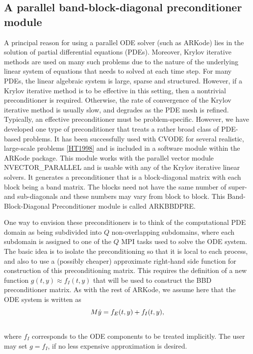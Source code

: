 \documentclass[letterpaper,10pt,english]{sphinxmanual}
\begin{document}
\subsection{A parallel band-block-diagonal preconditioner module}
\label{c_interface/Preconditioners:cinterface-bbdpre}\label{c_interface/Preconditioners:a-parallel-band-block-diagonal-preconditioner-module}
A principal reason for using a parallel ODE solver (such as ARKode)
lies in the solution of partial differential equations
(PDEs). Moreover, Krylov iterative methods are used on many such
problems due to the nature of the underlying linear system of
equations that needs to solved at each time step.  For many PDEs, the
linear algebraic system is large, sparse and structured.  However, if
a Krylov iterative method is to be effective in this setting, then a
nontrivial preconditioner is required.  Otherwise, the rate of
convergence of the Krylov iterative method is usually slow, and
degrades as the PDE mesh is refined.  Typically, an effective
preconditioner must be problem-specific.  However, we have developed
one type of preconditioner that treats a rather broad class of
PDE-based problems.  It has been successfully used with CVODE for
several realistic, large-scale problems {\hyperref[References:ht1998]{{[}HT1998{]}}} and is included
in a software module within the ARKode package.  This module works
with the parallel vector module NVECTOR\_PARALLEL and is usable
with any of the Krylov iterative linear solvers. It generates a
preconditioner that is a block-diagonal matrix with each block being a
band matrix. The blocks need not have the same number of super- and
sub-diagonals and these numbers may vary from block to block. This
Band-Block-Diagonal Preconditioner module is called ARKBBDPRE.

One way to envision these preconditioners is to think of the
computational PDE domain as being subdivided into $Q$
non-overlapping subdomains, where each subdomain is assigned to one of
the $Q$ MPI tasks used to solve the ODE system.  The basic idea
is to isolate the preconditioning so that it is local to each process,
and also to use a (possibly cheaper) approximate right-hand side
function for construction of this preconditioning matrix.  This
requires the definition of a new function $g(t,y) \approx
f_I(t,y)$ that will be used to construct the BBD preconditioner
matrix.  As with the rest of ARKode, we assume here that the ODE
system is written as
\begin{gather}
\begin{split}M\dot{y} = f_E(t,y) + f_I(t,y),\end{split}\notag\\\begin{split}\end{split}\notag
\end{gather}
where $f_I$ corresponds to the ODE components to be treated
implicitly.  The user may set $g = f_I$, if no less expensive
approximation is desired.
\end{document}
